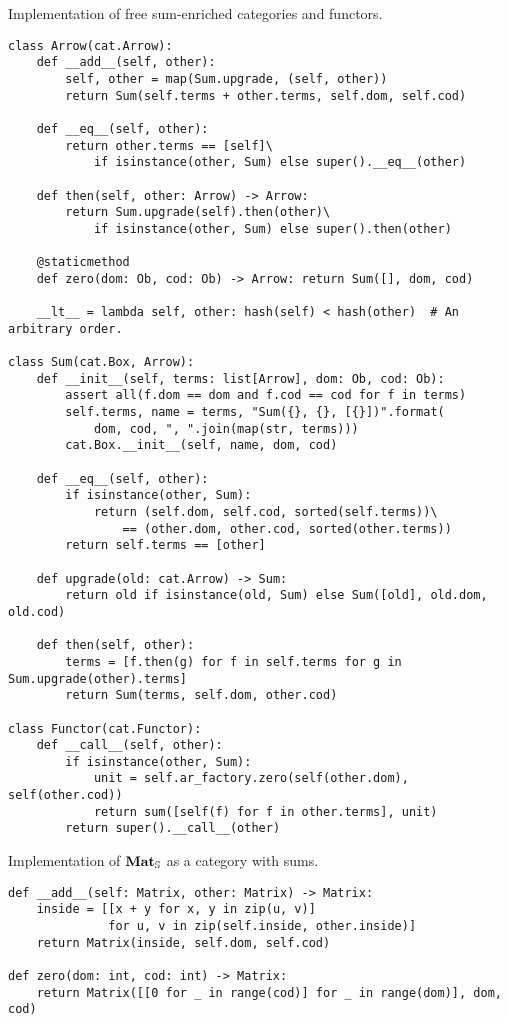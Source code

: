 \begin{python}
{\normalfont Implementation of free sum-enriched categories and functors.}

\begin{verbatim}
class Arrow(cat.Arrow):
    def __add__(self, other):
        self, other = map(Sum.upgrade, (self, other))
        return Sum(self.terms + other.terms, self.dom, self.cod)

    def __eq__(self, other):
        return other.terms == [self]\
            if isinstance(other, Sum) else super().__eq__(other)

    def then(self, other: Arrow) -> Arrow:
        return Sum.upgrade(self).then(other)\
            if isinstance(other, Sum) else super().then(other)

    @staticmethod
    def zero(dom: Ob, cod: Ob) -> Arrow: return Sum([], dom, cod)

    __lt__ = lambda self, other: hash(self) < hash(other)  # An arbitrary order.

class Sum(cat.Box, Arrow):
    def __init__(self, terms: list[Arrow], dom: Ob, cod: Ob):
        assert all(f.dom == dom and f.cod == cod for f in terms)
        self.terms, name = terms, "Sum({}, {}, [{}])".format(
            dom, cod, ", ".join(map(str, terms)))
        cat.Box.__init__(self, name, dom, cod)

    def __eq__(self, other):
        if isinstance(other, Sum):
            return (self.dom, self.cod, sorted(self.terms))\
                == (other.dom, other.cod, sorted(other.terms))
        return self.terms == [other]

    def upgrade(old: cat.Arrow) -> Sum:
        return old if isinstance(old, Sum) else Sum([old], old.dom, old.cod)

    def then(self, other):
        terms = [f.then(g) for f in self.terms for g in Sum.upgrade(other).terms]
        return Sum(terms, self.dom, other.cod)

class Functor(cat.Functor):
    def __call__(self, other):
        if isinstance(other, Sum):
            unit = self.ar_factory.zero(self(other.dom), self(other.cod))
            return sum([self(f) for f in other.terms], unit)
        return super().__call__(other)
\end{verbatim}
\end{python}

\begin{python}
{\normalfont Implementation of $\mathbf{Mat}_\S$ as a category with sums.}

\begin{verbatim}
def __add__(self: Matrix, other: Matrix) -> Matrix:
    inside = [[x + y for x, y in zip(u, v)]
              for u, v in zip(self.inside, other.inside)]
    return Matrix(inside, self.dom, self.cod)

def zero(dom: int, cod: int) -> Matrix:
    return Matrix([[0 for _ in range(cod)] for _ in range(dom)], dom, cod)
\end{verbatim}
\end{python}

